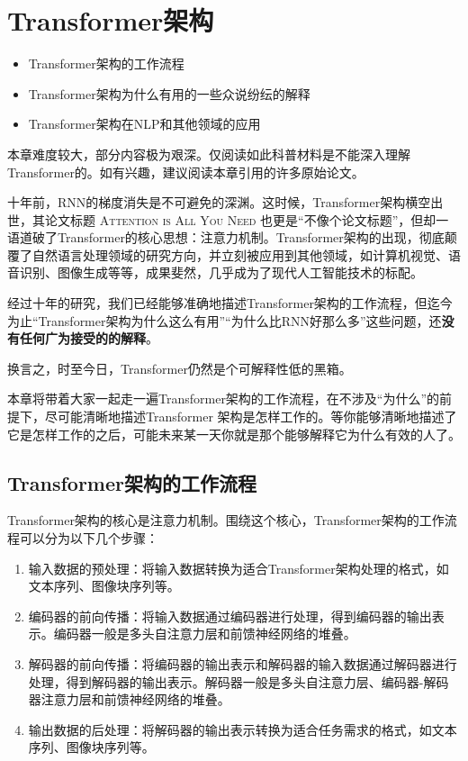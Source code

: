 \chapter{Transformer架构}

\begin{intro}
\begin{itemize}
    \item Transformer架构的工作流程
    \item Transformer架构为什么有用的一些众说纷纭的解释
    \item Transformer架构在NLP和其他领域的应用
\end{itemize}
本章难度较大，部分内容极为艰深。仅阅读如此科普材料是不能深入理解Transformer的。如有兴趣，建议阅读本章引用的许多原始论文。
\end{intro}

十年前，RNN的梯度消失是不可避免的深渊。这时候，Transformer架构横空出世，其论文标题 \textsc{Attention is All You Need} 也更是“不像个论文标题”，但却一语道破了Transformer的核心思想：注意力机制。Transformer架构的出现，彻底颠覆了自然语言处理领域的研究方向，并立刻被应用到其他领域，如计算机视觉、语音识别、图像生成等等，成果斐然，几乎成为了现代人工智能技术的标配。

经过十年的研究，我们已经能够准确地描述Transformer架构的工作流程，但迄今为止“Transformer架构为什么这么有用”“为什么比RNN好那么多”这些问题，还\textbf{没有任何广为接受的的解释}。

换言之，时至今日，Transformer仍然是个可解释性低的黑箱。

本章将带着大家一起走一遍Transformer架构的工作流程，在不涉及“为什么”的前提下，尽可能清晰地描述Transformer 架构是怎样工作的。等你能够清晰地描述了它是怎样工作的之后，可能未来某一天你就是那个能够解释它为什么有效的人了。

\section{Transformer架构的工作流程}

Transformer架构的核心是注意力机制。围绕这个核心，Transformer架构的工作流程可以分为以下几个步骤：
\begin{enumerate}
    \item 输入数据的预处理：将输入数据转换为适合Transformer架构处理的格式，如文本序列、图像块序列等。
    \item 编码器的前向传播：将输入数据通过编码器进行处理，得到编码器的输出表示。编码器一般是多头自注意力层和前馈神经网络的堆叠。
    \item 解码器的前向传播：将编码器的输出表示和解码器的输入数据通过解码器进行处理，得到解码器的输出表示。解码器一般是多头自注意力层、编码器-解码器注意力层和前馈神经网络的堆叠。
    \item 输出数据的后处理：将解码器的输出表示转换为适合任务需求的格式，如文本序列、图像块序列等。
\end{enumerate}

